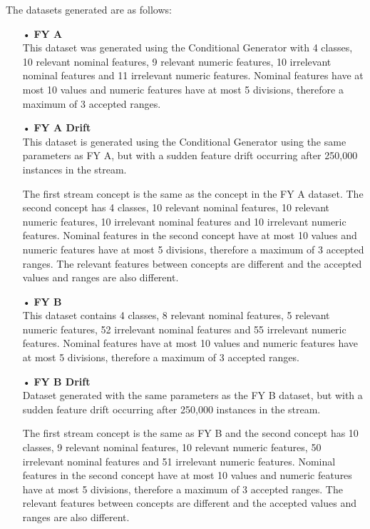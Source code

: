 The datasets generated are as follows:
\begin{itemize}
\item[•]\textbf{FY A} \\
This dataset was generated using the Conditional Generator with 4 classes, 10 relevant nominal features, 9 relevant numeric features, 10 irrelevant nominal features and 11 irrelevant numeric features. Nominal features have at most 10 values and numeric features have at most 5 divisions, therefore a maximum of 3 accepted ranges.

\item[•]\textbf{FY A Drift}\\
This dataset is generated using the Conditional Generator using the same parameters as FY A, but with a sudden feature drift occurring after 250,000 instances in the stream.

The first stream concept is the same as the concept in the FY A dataset. The second concept has 4 classes, 10 relevant nominal features, 10 relevant numeric features, 10 irrelevant nominal features and 10 irrelevant numeric features. Nominal features in the second concept have at most 10 values and numeric features have at most 5 divisions, therefore a maximum of 3 accepted ranges. The relevant features between concepts are different and the accepted values and ranges are also different.

\item[•]\textbf{FY B}\\
This dataset contains 4 classes, 8 relevant nominal features, 5 relevant numeric features, 52 irrelevant nominal features and 55 irrelevant numeric features. Nominal features have at most 10 values and numeric features have at most 5 divisions, therefore a maximum of 3 accepted ranges.

\item[•]\textbf{FY B Drift}\\
Dataset generated with the same parameters as the FY B dataset, but with a sudden feature drift occurring after 250,000 instances in the stream. 

The first stream concept is the same as FY B and the second concept has 10 classes, 9 relevant nominal features, 10 relevant numeric features, 50 irrelevant nominal features and 51 irrelevant numeric features. Nominal features in the second concept have at most 10 values and numeric features have at most 5 divisions, therefore a maximum of 3 accepted ranges. The relevant features between concepts are different and the accepted values and ranges are also different.


\end{itemize}
